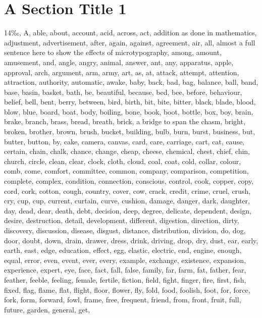 \section{A Section Title 1 
}
\begin{multicols}{2}14{\mktsFontfileOptima‰}, A, able, about, account, acid, across, act, addition as done in mathematics, adjustment,
advertisement, after, again, against, agreement, air, all, almost a full sentence here
to show the effects of microtypography, among,
amount, amusement, and, angle, angry, animal, answer, ant, any, apparatus,
apple, approval, arch, argument, arm, army, art, as, at, attack, attempt,
attention, attraction, authority, automatic, awake, baby, back, bad, bag,
balance, ball, band, base, basin, basket, bath, be, beautiful, because, bed,
bee, before, behaviour, belief, bell, bent, berry, between, bird, birth, bit,
bite, bitter, black, blade, blood, blow, blue, board, boat, body, boiling,
bone, book, boot, bottle, box, boy, brain, brake, branch, brass, bread,
breath, brick, a bridge to span the chasm, bright, broken, brother, brown, brush, bucket,
building, bulb, burn, burst, business, but, butter, button, by, cake, camera,
canvas, card, care, carriage, cart, cat, cause, certain, chain, chalk, chance,
change, cheap, cheese, chemical, chest, chief, chin, church, circle, clean,
clear, clock, cloth, cloud, coal, coat, cold, collar, colour, comb, come,
comfort, committee, common, company, comparison, competition, complete,
complex, condition, connection, conscious, control, cook, copper, copy, cord,
cork, cotton, cough, country, cover, cow, crack, credit, crime, cruel, crush,
cry, cup, cup, current, curtain, curve, cushion, damage, danger, dark,
daughter, day, dead, dear, death, debt, decision, deep, degree, delicate,
dependent, design, desire, destruction, detail, development, different,
digestion, direction, dirty, discovery, discussion, disease, disgust,
distance, distribution, division, do, dog, door, doubt, down, drain, drawer,
dress, drink, driving, drop, dry, dust, ear, early, earth, east, edge,
education, effect, egg, elastic, electric, end, engine, enough, equal, error,
even, event, ever, every, example, exchange, existence, expansion, experience,
expert, eye, face, fact, fall, false, family, far, farm, fat, father, fear,
feather, feeble, feeling, female, fertile, fiction, field, fight, finger,
fire, first, fish, fixed, flag, flame, flat, flight, floor, flower, fly, fold,
food, foolish, foot, for, force, fork, form, forward, fowl, frame, free,
frequent, friend, from, front, fruit, full, future, garden, general, get,

\end{multicols}
